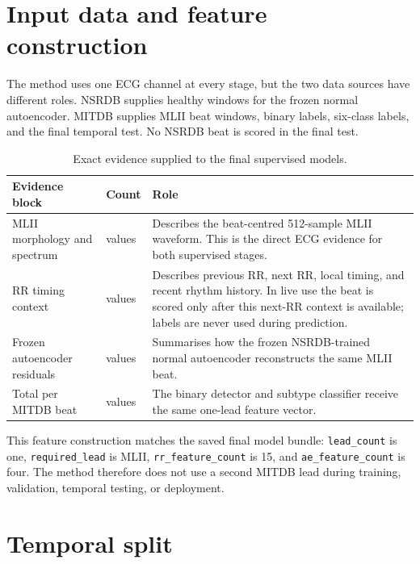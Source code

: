 \section{Input data and feature construction}

The method uses one ECG channel at every stage, but the two data sources have
different roles. NSRDB supplies healthy windows for the frozen normal
autoencoder. MITDB supplies MLII beat windows, binary labels, six-class labels,
and the final temporal test. No NSRDB beat is scored in the final test.

\begin{table}[H]
\centering
\caption{Exact evidence supplied to the final supervised models.}
\label{tab:method-feature-input}
\begin{tabular}{>{\raggedright\arraybackslash}p{}
                >{\raggedright\arraybackslash}p{}
                >{\raggedright\arraybackslash}p{}}
\toprule
Evidence block & Count & Role\\
\midrule
MLII morphology and spectrum & 223 values & Describes the beat-centred
512-sample MLII waveform. This is the direct ECG evidence for both supervised
stages.\\
RR timing context & 15 values & Describes previous RR, next RR, local timing,
and recent rhythm history. In live use the beat is scored only after this
next-RR context is available; labels are never used during prediction.\\
Frozen autoencoder residuals & 4 values & Summarises how the frozen
NSRDB-trained normal autoencoder reconstructs the same MLII beat.\\
\midrule
Total per MITDB beat & 242 values & The binary detector and subtype classifier
receive the same one-lead feature vector.\\
\bottomrule
\end{tabular}
\end{table}

This feature construction matches the saved final model bundle:
\texttt{lead\_count} is one, \texttt{required\_lead} is MLII,
\texttt{rr\_feature\_count} is 15, and \texttt{ae\_feature\_count} is four.
The method therefore does not use a second MITDB lead during training,
validation, temporal testing, or deployment.

\section{Temporal split}

